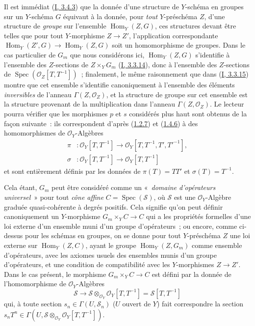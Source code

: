Il est immédiat (\hyperref[I.3.4.3-fr]{I, 3.4.3}) que la donnée d'une structure
de $Y$-schéma en groupes sur un $Y$-schéma $G$ équivaut à la donnée, pour
\emph{tout} $Y$-préschéma $Z$, d'une structure de \emph{groupe} sur
l'ensemble $\operatorname{Hom}_Y(Z,G)$, ces structures devant être telles que
pour tout $Y$-morphisme $Z\to Z'$, l'application correspondante
$\operatorname{Hom}_Y(Z',G)\to\operatorname{Hom}_Y(Z,G)$ soit un
homomorphisme de groupes. Dans le cas particulier de $G_m$ que nous
considérons ici, $\operatorname{Hom}_Y(Z,G)$ s'identifie à l'ensemble des
$Z$-sections de $Z\times_YG_m$ (\hyperref[I.3.3.14-fr]{I, 3.3.14}), donc à
l'ensemble des $Z$-sections de
$\operatorname{Spec}(\mathcal{O}_Z[T,T^{-1}])$~; finalement, le même
raisonnement que dans (\hyperref[I.3.3.15-fr]{I, 3.3.15}) montre que cet
ensemble s'identifie canoniquement à l'ensemble des éléments \emph{inversibles}
de l'anneau $\Gamma(Z,\mathcal{O}_Z)$, et la structure de groupe sur cet
ensemble est la structure provenant de la multiplication dans l'anneau
$\Gamma(Z,\mathcal{O}_Z)$. Le lecteur pourra vérifier que les morphismes $p$
et $s$ considérés plus haut sont obtenus de la façon suivante~: ils
correspondent d'après (\hyperref[II.1.2.7-fr]{1.2.7}) et
(\hyperref[II.1.4.6-fr]{1.4.6}) à des homomorphismes de $\mathcal{O}_Y$-Algèbres
\begin{align*}
  \pi &: \mathcal{O}_Y[T,T^{-1}]
  \to\mathcal{O}_Y[T,T^{-1},T',T'^{-1}],\\
  \sigma &: \mathcal{O}_Y[T,T^{-1}]\to\mathcal{O}_Y[T,T^{-1}]
\end{align*}
et sont entièrement définis par les données de $\pi(T)=TT'$ et
$\sigma(T)=T^{-1}$.

Cela étant, $G_m$ peut être considéré comme un «~\emph{domaine d'opérateurs
universel}~» pour tout \emph{cône affine}
$C=\operatorname{Spec}(\mathcal{S})$, où $\mathcal{S}$ est une
$\mathcal{O}_Y$-Algèbre graduée quasi-cohérente à degrés positifs. Cela
signifie qu'on peut définir canoniquement un $Y$-morphisme
$G_m\times_YC\to C$ qui a les propriétés formelles d'une loi externe d'un
ensemble muni d'un groupe d'opérateurs~; ou encore, comme ci-dessus pour les
schémas en groupes, on se donne pour tout $Y$-préschéma $Z$ une loi externe
sur $\operatorname{Hom}_Y(Z,C)$, ayant le groupe
$\operatorname{Hom}_Y(Z,G_m)$ comme ensemble d'opérateurs, avec les axiomes
usuels des ensembles munis d'un groupe d'opérateurs, et une condition de
compatibilité avec les $Y$-morphismes $Z\to Z'$. Dans le cas présent, le
morphisme $G_m\times_YC\to C$ est défini par la donnée de l'homomorphisme de
$\mathcal{O}_Y$-Algèbres
\[
  \mathcal{S}\to
  \mathcal{S}\otimes_{\mathcal{O}_Y}\mathcal{O}_Y[T,T^{-1}]
  =\mathcal{S}[T,T^{-1}]
\]
qui, à toute section $s_n\in\Gamma(U,\mathcal{S}_n)$ ($U$ ouvert de $Y$) fait
correspondre la section
$s_nT^n\in\Gamma(U,\mathcal{S}\otimes_{\mathcal{O}_Y}
\mathcal{O}_Y[T,T^{-1}])$.

